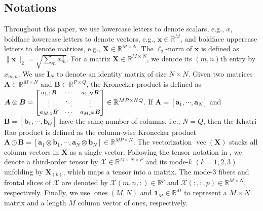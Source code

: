 \documentclass[12pt]{article}
\newcommand{\bd}[1]{\boldsymbol{#1}}
\begin{document}
\subsection{Notations}
Throughout this paper, we use lowercase letters to denote scalars, e.g., $x$, boldface lowercase letters to denote vectors, e.g., $\boldsymbol{x}\in\mathbb{R}^{M}$, and boldface uppercase letters to denote matrices, e.g., $\boldsymbol{X}\in\mathbb{R}^{M\times N}$. The $\ell_{2}$-norm of $\boldsymbol{x}$ is defined as $\|\boldsymbol{x}\|_{2}=\sqrt{\sum_{m}x_{m}^{2}}$. For a matrix $\boldsymbol{X}\in\mathbb{R}^{M\times N}$, we denote its $(m,n)$th entry by $x_{m,n}$. We use $\bd{I}_{N}$ to denote an identity matrix of size $N\times N$. Given two matrices $\boldsymbol{A}\in\mathbb{R}^{M\times N}$ and $\boldsymbol{B}\in\mathbb{R}^{P\times Q}$, the Kronecker product is defined as $\boldsymbol{A}\otimes\boldsymbol{B}=
\footnotesize{\begin{bmatrix}
  a_{1,1}\boldsymbol{B} & \cdots & a_{1,N}\boldsymbol{B} \\
  \vdots & \ddots & \vdots \\
  a_{M,1}\boldsymbol{B} & \cdots & a_{M,N}\boldsymbol{B}
\end{bmatrix}}\in\mathbb{R}^{MP\times NQ}$. If $\boldsymbol{A}=[\boldsymbol{a}_{1},\cdots,\boldsymbol{a}_{N}]$ and $\boldsymbol{B}=[\boldsymbol{b}_{1},\cdots,\boldsymbol{b}_{Q}]$ have the same number of columns, i.e., $N=Q$, then the Khatri-Rao product is defined as the column-wise Kronecker product $\boldsymbol{A}\odot\boldsymbol{B}=[\boldsymbol{a}_{1}\otimes\boldsymbol{b}_{1},\cdots,\boldsymbol{a}_{N}\otimes\boldsymbol{b}_{N}]\in\mathbb{R}^{MP\times N}$. The vectorization $\operatorname{vec}(\bd{X})$ stacks all column vectors in $\bd{X}$ as a single vector. Following the tensor notation in \citet{kolda2009tensor}, we denote a third-order tensor by $\boldsymbol{\mathcal{X}}\in\mathbb{R}^{M\times N\times P}$ and its mode-$k$ $(k=\text{1},\text{2},\text{3})$ unfolding by $\boldsymbol{X}_{(k)}$, which maps a tensor into a matrix. The mode-3 fibers and frontal slices of $\boldsymbol{\mathcal{X}}$ are denoted by $\boldsymbol{\mathcal{X}}(m,n,:)\in\mathbb{R}^{p}$ and $\boldsymbol{\mathcal{X}}(:,:,p)\in\mathbb{R}^{M\times N}$, respectively. Finally, we use $\operatorname{ones}(M,N)$ and $\boldsymbol{1}_{M}\in\mathbb{R}^{M}$ to represent a $M\times N$ matrix and a length $M$ column vector of ones, respectively.
\end{document}
